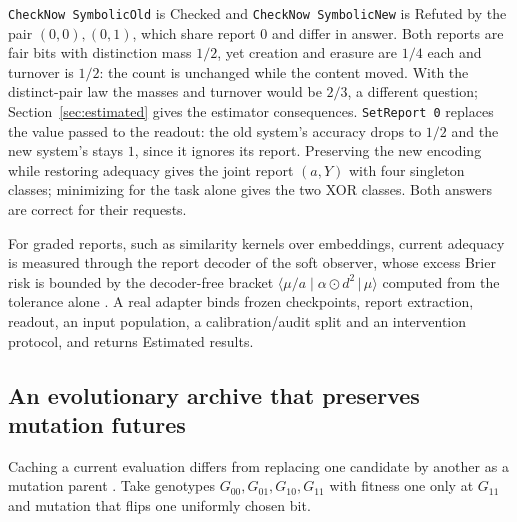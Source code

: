 \documentclass[11pt]{article}
\newcommand{\code}[1]{\texttt{#1}}
\newcommand{\br}[2]{\langle #1 \mid #2 \rangle}
\theoremstyle{definition}
\theoremstyle{plain}
\begin{document}
\code{CheckNow SymbolicOld} is Checked and \code{CheckNow SymbolicNew} is Refuted by the pair
$(0,0),(0,1)$, which share report $0$ and differ in answer. Both reports are fair bits with
distinction mass $1/2$, yet creation and erasure are $1/4$ each and turnover is $1/2$: the count is
unchanged while the content moved. With the distinct-pair law the masses and turnover would be
$2/3$, a different question; Section~\ref{sec:estimated} gives the estimator consequences.
\code{SetReport 0} replaces the value passed to the readout: the old system's accuracy drops to $1/2$
and the new system's stays $1$, since it ignores its report. Preserving the new encoding while
restoring adequacy gives the joint report $(a,Y)$ with four singleton classes; minimizing for the
task alone gives the two XOR classes. Both answers are correct for their requests.

For graded reports, such as similarity kernels over embeddings, current adequacy is measured through
the report decoder of the soft observer, whose excess Brier risk is bounded by the decoder-free
bracket $\br{\mu/a}{\alpha\odot d^2\,|\,\mu}$ computed from the tolerance alone \cite{paperone}. A real
adapter binds frozen checkpoints, report extraction, readout, an input population, a
calibration/audit split and an intervention protocol, and returns Estimated results.

\subsection{An evolutionary archive that preserves mutation futures}\label{sec:evo}

Caching a current evaluation differs from replacing one candidate by another as a mutation parent
\cite{evolearn}. Take genotypes $G_{00},G_{01},G_{10},G_{11}$ with fitness one only at $G_{11}$ and
mutation that flips one uniformly chosen bit.
\end{document}
